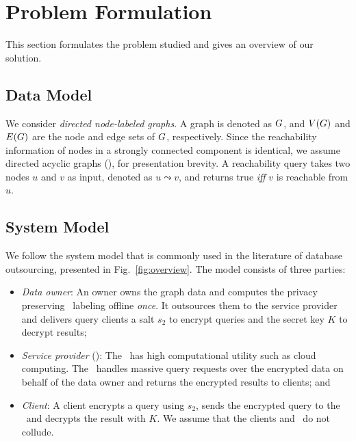 \section{Problem Formulation}
\label{sec:formulation}

This section formulates the problem studied and gives an overview of our solution.


\subsection{Data Model}
We consider {\em directed
  node-labeled graphs}.  A graph is denoted as $G$, and $V(G)$ and
$E(G)$ are the node and edge sets of $G$, respectively.  Since the
reachability information of nodes in a strongly connected component is identical, we assume directed acyclic graphs
(\DAG), for presentation brevity. A reachability query takes two nodes
$u$ and $v$ as input, denoted as $u \leadsto v$, and returns true {\it
  iff} $v$ is reachable from $u$.


\subsection{System Model}
\label{subsec:system_model}
We follow the system model that is
commonly used in the literature of database outsourcing, presented in
Fig.~\ref{fig:overview}.  The model consists of three parties:
%

\begin{itemize}%
\item {\em Data owner}: An owner owns the graph data and computes the
    privacy preserving \hop\ labeling offline {\em once}. It  outsources them to the
    service provider and delivers query clients a salt $s_2$ to encrypt queries
    and the secret key $K$ to decrypt results;  
\item {\em Service provider} (\SP): The \SP\ has high computational
  utility such as cloud computing. The \SP\ handles massive query
  requests over the encrypted data on behalf of the data owner and
  returns the encrypted results to clients; and
\item {\em Client}: A client encrypts a query using $s_2$, sends the
  encrypted query to the \SP\ and decrypts the result with
  $K$. We assume that the clients and \SP\ do not collude.
%
\end{itemize}


